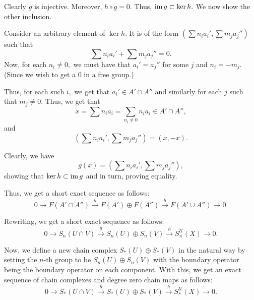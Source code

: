 \documentclass[12pt]{article}
\begin{document}
Clearly $g$ is injective. Moreover, $h \circ g = 0.$ Thus, $\operatorname{im} g \subset \ker h.$ We now show the other inclusion. 

Consider an arbitrary element of $\ker h.$ It is of the form $\left(\sum n_ia_i', \sum m_ja_j''\right)$ such that
\begin{equation*} 
	\sum n_ia_i' + \sum m_ja_j'' = 0.
\end{equation*}
Now, for each $n_i \neq 0,$ we must have that $a_i' = a_j''$ for some $j$ and $n_i = -m_j.$ (Since we wish to get a $0$ in a free group.)

Thus, for each such $i,$ we get that $a_i' \in A' \cap A''$ and similarly for each $j$ such that $m_j \neq 0.$ Thus, we get that
\begin{equation*} 
	x = \sum n_i a_i = \sum_{n_i \neq 0} n_ia_i \in A' \cap A'',
\end{equation*}
and
\begin{equation*} 
	\left(\sum n_ia_i', \sum m_ja_j''\right) = (x, -x).
\end{equation*}

Clearly, we have
\begin{equation*} 
	g(x) = \left(\sum n_ia_i', \sum m_ja_j''\right),
\end{equation*}
showing that $\ker h \subset \operatorname{im} g$ and in turn, proving equality.

Thus, we get a short exact sequence as follows:
\begin{equation*} 
	0 \overset{}{\longrightarrow} F(A' \cap A'') \overset{g}{\longrightarrow} F(A') \oplus F(A'') \overset{h}{\longrightarrow} F(A' \cup A'') \overset{}{\longrightarrow} 0.
\end{equation*}

Rewriting, we get a short exact sequence as follows:
\begin{equation*} 
	0 \overset{}{\longrightarrow} S_n(U\cap V) \overset{g}{\longrightarrow} S_n(U) \oplus S_n(V) \overset{h}{\longrightarrow} S^{\mathcal{U}}_n(X) \overset{}{\longrightarrow} 0.
\end{equation*}

Now, we define a new chain complex $S_*(U) \oplus S_*(V)$ in the natural way by setting the $n$-th group to be $S_n(U) \oplus S_n(V)$ with the boundary operator being the boundary operator on each component. With this, we get an exact sequence of chain complexes and degree zero chain maps as follows:
\begin{equation*} 
	0 \overset{}{\longrightarrow} S_*(U\cap V) \overset{g}{\longrightarrow} S_*(U) \oplus S_*(V) \overset{h}{\longrightarrow} S^{\mathcal{U}}_*(X) \overset{}{\longrightarrow} 0.
\end{equation*}
\end{document}
